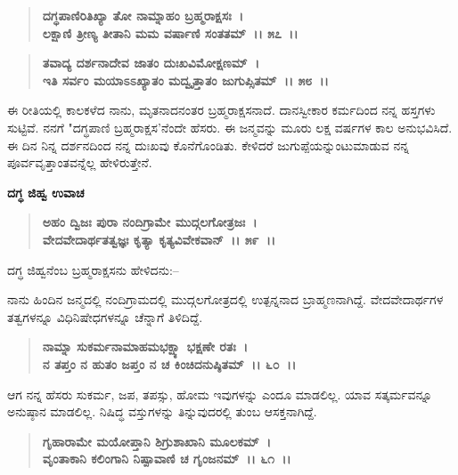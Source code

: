 \begin{verse}
\textbf{ದಗ್ಧಪಾಣಿರಿತಿಖ್ಯಾ ತೋ ನಾಮ್ನಾಹಂ ಬ್ರಹ್ಮರಾಕ್ಷಸಃ~।}\\\textbf{ಲಕ್ಷಾಣಿ ತ್ರೀಣ್ಯ ತೀತಾನಿ ಮಮ ವರ್ಷಾಣಿ ಸಂತತಮ್~।। ೫೭~।। }
\end{verse}

\begin{verse}
\textbf{ತವಾದ್ಯ ದರ್ಶನಾದೇವ ಜಾತಂ ದುಃಖವಿಮೋಕ್ಷಣಮ್~।}\\\textbf{ಇತಿ ಸರ್ವಂ ಮಯಾಽಽಖ್ಯಾತಂ ಮದ್ವೃತ್ತಾತಂ ಜುಗುಪ್ಸಿತಮ್~।। ೫೮~।।}
\end{verse}

ಈ ರೀತಿಯಲ್ಲಿ ಕಾಲಕಳೆದ ನಾನು, ಮೃತನಾದನಂತರ ಬ್ರಹ್ಮರಾಕ್ಷಸನಾದೆ. ದಾನಸ್ವೀಕಾರ ಕರ್ಮದಿಂದ ನನ್ನ ಹಸ್ತಗಳು ಸುಟ್ಟಿವೆ. ನನಗೆ "ದಗ್ಧಪಾಣಿ ಬ್ರಹ್ಮರಾಕ್ಷಸ'ನೆಂದೇ ಹೆಸರು. ಈ ಜನ್ಮವನ್ನು ಮೂರು ಲಕ್ಷ ವರ್ಷಗಳ ಕಾಲ ಅನುಭವಿಸಿದೆ. ಈ ದಿನ ನಿನ್ನ ದರ್ಶನದಿಂದ ನನ್ನ ದುಃಖವು ಕೊನೆಗೊಂಡಿತು. ಕೇಳಿದರೆ ಜುಗುಪ್ಪೆಯನ್ನುಂಟುಮಾಡುವ ನನ್ನ ಪೂರ್ವವೃತ್ತಾಂತವನ್ನೆಲ್ಲ ಹೇಳಿರುತ್ತೇನೆ.

\begin{flushleft}
\textbf{ದಗ್ಧ ಜಿಹ್ವ ಉವಾಚ}
\end{flushleft}

\begin{verse}
\textbf{ಅಹಂ ದ್ವಿಜಃ ಪುರಾ ನಂದಿಗ್ರಾಮೇ ಮುದ್ಗಲಗೋತ್ರಜಃ~।}\\\textbf{ವೇದವೇದಾರ್ಥತತ್ವಜ್ಞಃ ಕೃತ್ಯಾ ಕೃತ್ಯವಿವೇಕವಾನ್~।। ೫೯~।।}
\end{verse}

\begin{flushleft}
ದಗ್ಧ ಜಿಹ್ವನೆಂಬ ಬ್ರಹ್ಮರಾಕ್ಷಸನು ಹೇಳಿದನು:–
\end{flushleft}

ನಾನು ಹಿಂದಿನ ಜನ್ಮದಲ್ಲಿ ನಂದಿಗ್ರಾಮದಲ್ಲಿ ಮುದ್ಗಲಗೋತ್ರದಲ್ಲಿ ಉತ್ಪನ್ನನಾದ ಬ್ರಾಹ್ಮಣನಾಗಿದ್ದೆ. ವೇದವೇದಾರ್ಥಗಳ ತತ್ವಗಳನ್ನೂ ವಿಧಿನಿಷೇಧಗಳನ್ನೂ ಚೆನ್ನಾಗೆ ತಿಳಿದಿದ್ದೆ.

\begin{verse}
\textbf{ನಾಮ್ನಾ ಸುಕರ್ಮನಾಮಾಹಮಭಕ್ಷ್ಯಾ ಭಕ್ಷಣೇ ರತಃ~।}\\\textbf{ನ ತಪ್ತಂ ನ ಹುತಂ ಜಪ್ತಂ ನ ಚ ಕಿಂಚಿದನುಷ್ಠಿತಮ್~।। ೬೦~।।}
\end{verse}

ಆಗ ನನ್ನ ಹೆಸರು ಸುಕರ್ಮ, ಜಪ, ತಪಸ್ಸು, ಹೋಮ ಇವುಗಳನ್ನು ಎಂದೂ ಮಾಡಲಿಲ್ಲ. ಯಾವ ಸತ್ಕರ್ಮವನ್ನೂ ಅನುಷ್ಠಾನ ಮಾಡಲಿಲ್ಲ. ನಿಷಿದ್ಧ ವಸ್ತುಗಳನ್ನು ತಿನ್ನುವುದರಲ್ಲಿ ತುಂಬ ಆಸಕ್ತನಾಗಿದ್ದೆ.

\begin{verse}
\textbf{ಗೃಹಾರಾಮೇ ಮಯೋಪ್ತಾನಿ ಶಿಗ್ರುಶಾಖಾನಿ ಮೂಲಕಮ್~।}\\\textbf{ವೃಂತಾಕಾನಿ ಕಲಿಂಗಾನಿ ನಿಷ್ಪಾವಾಣಿ ಚ ಗೃಂಜನಮ್~।। ೬೧~।।} 
\end{verse}

